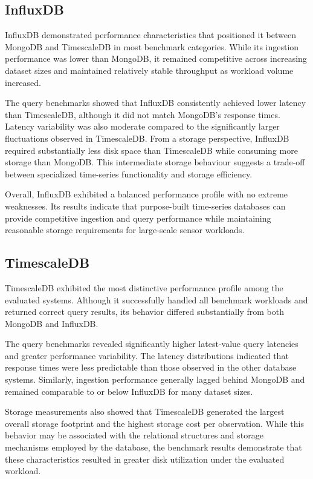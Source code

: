 \subsection{InfluxDB}
InfluxDB demonstrated performance characteristics that positioned it between MongoDB and TimescaleDB in most benchmark categories. While its ingestion performance was lower than MongoDB, it remained competitive across increasing dataset sizes and maintained relatively stable throughput as workload volume increased.

The query benchmarks showed that InfluxDB consistently achieved lower latency than TimescaleDB, although it did not match MongoDB's response times. Latency variability was also moderate compared to the significantly larger fluctuations observed in TimescaleDB. From a storage perspective, InfluxDB required substantially less disk space than TimescaleDB while consuming more storage than MongoDB. This intermediate storage behaviour suggests a trade-off between specialized time-series functionality and storage efficiency.

Overall, InfluxDB exhibited a balanced performance profile with no extreme weaknesses. Its results indicate that purpose-built time-series databases can provide competitive ingestion and query performance while maintaining reasonable storage requirements for large-scale sensor workloads.


\subsection{TimescaleDB}
TimescaleDB exhibited the most distinctive performance profile among the evaluated systems. Although it successfully handled all benchmark workloads and returned correct query results, its behavior differed substantially from both MongoDB and InfluxDB.

The query benchmarks revealed significantly higher latest-value query latencies and greater performance variability. The latency distributions indicated that response times were less predictable than those observed in the other database systems. Similarly, ingestion performance generally lagged behind MongoDB and remained comparable to or below InfluxDB for many dataset sizes.

Storage measurements also showed that TimescaleDB generated the largest overall storage footprint and the highest storage cost per observation. While this behavior may be associated with the relational structures and storage mechanisms employed by the database, the benchmark results demonstrate that these characteristics resulted in greater disk utilization under the evaluated workload.

